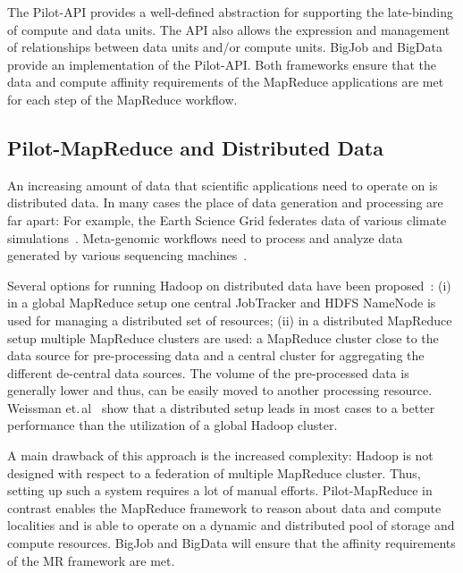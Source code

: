 \documentclass{acm_proc_article-sp}
\newcommand{\pilotmapreduce}{Pilot-MapReduce\xspace}
\begin{document}
The Pilot-API provides a well-defined abstraction for supporting the
late-binding of compute and data units. The API also allows the expression and
management of relationships between data units and/or compute units. BigJob
and BigData provide an implementation of the Pilot-API. Both frameworks ensure
that the data and compute affinity requirements of the MapReduce applications
are met for each step of the MapReduce workflow.


\subsection{Pilot-MapReduce and Distributed Data}
\label{sec:pmr-distributed}
An increasing amount of data that scientific applications need to operate on 
is distributed data. In many cases the place of data 
generation and processing are far apart: For example, the Earth Science Grid 
federates data of various climate simulations~\cite{ESG}. Meta-genomic 
workflows need to process and analyze data generated by various sequencing 
machines~\cite{Jha:2011fk}.

Several options for running Hadoop on distributed data have been
proposed~\cite{weissman-mr-11}: (i) in a global MapReduce setup one central
JobTracker and HDFS NameNode is used for managing a distributed set of
resources; (ii) in a distributed MapReduce setup multiple MapReduce clusters
are used: a MapReduce cluster close to the data source for pre-processing data
and a central cluster for aggregating the different de-central data sources.
The volume of the pre-processed data is generally lower and thus, can be
easily moved to another processing resource. Weissman
et.\,al~\cite{weissman-mr-11} show that a distributed setup leads in most
cases to a better performance than the utilization of a global Hadoop cluster.

A main drawback of this approach is the increased complexity: Hadoop is not 
designed with respect to a federation of multiple MapReduce cluster. Thus, 
setting up such a system requires a lot of manual efforts. \pilotmapreduce in 
contrast enables the MapReduce framework to reason about data and compute 
localities and is able to operate on a dynamic and distributed pool of storage 
and compute resources. BigJob and BigData will ensure that the affinity 
requirements of the MR framework are met.
\end{document}
